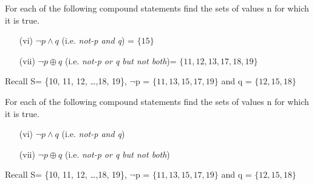 For each of the following compound statements find the sets of values n for which it is true. 
\begin{itemize}
\item[(vi)] $\neg p \wedge q$ (i.e. \textit{not-p and q}) = $\{15\} $
\item[(vii)] $ \neg p \oplus q$ (i.e. \textit{ not-p or q but not both})= $\{11, 12, 13, 17, 18, 19\}$
\end{itemize}

Recall S= \{10, 11, 12, \ldots ,18, 19\}, $\neg$p = $\{ 11, 13, 15, 17, 19\}$  and q = $\{12,15,18\}$

For each of the following compound statements find the sets of values n for which it is true. 
\begin{itemize}
\item[(vi)] $\neg p \wedge q$ (i.e. \textit{not-p and q}) %
\item[(vii)] $ \neg p \oplus q$ (i.e. \textit{ not-p or q but not both}) %
\end{itemize}

Recall S= \{10, 11, 12, \ldots ,18, 19\}, $\neg$p = $\{ 11, 13, 15, 17, 19\}$  and q = $\{12,15,18\}$
